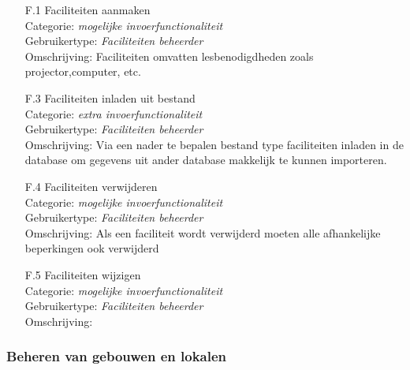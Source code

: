 \documentclass{article}
\begin{document}
\begin{itemize}
\item[F.1] Faciliteiten aanmaken \\
Categorie: \textit{mogelijke invoerfunctionaliteit} \\
Gebruikertype: \textit{Faciliteiten beheerder} \\
Omschrijving: Faciliteiten omvatten lesbenodigdheden zoals projector,computer, etc. \\[-3mm]

\item[F.3] Faciliteiten inladen uit bestand \\
Categorie: \textit{extra  invoerfunctionaliteit} \\
Gebruikertype: \textit{Faciliteiten beheerder} \\
Omschrijving: Via een nader te bepalen bestand type faciliteiten inladen in de database om gegevens uit ander database makkelijk te kunnen importeren. \\[-3mm]

\item[F.4] Faciliteiten verwijderen \\
Categorie: \textit{mogelijke invoerfunctionaliteit} \\
Gebruikertype: \textit{Faciliteiten beheerder}  \\
Omschrijving: Als een faciliteit wordt verwijderd moeten alle afhankelijke beperkingen ook verwijderd \\[-3mm]

\item[F.5] Faciliteiten wijzigen  \\
Categorie: \textit{mogelijke invoerfunctionaliteit} \\
Gebruikertype: \textit{Faciliteiten  beheerder} \\
Omschrijving: \\[-3mm]
\end{itemize}

\subsubsection{Beheren van gebouwen en lokalen}
\end{document}
